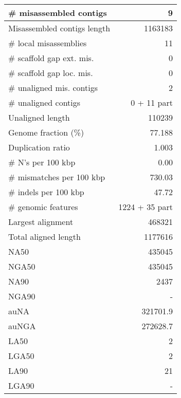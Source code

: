 \documentclass[12pt,a4paper]{article}
\begin{document}
\begin{table}[ht]
\begin{center}
\begin{tabular}{|l*{1}{|r}|}
\# misassembled contigs & 9 \\ \hline
Misassembled contigs length & 1163183 \\ \hline
\# local misassemblies & 11 \\ \hline
\# scaffold gap ext. mis. & 0 \\ \hline
\# scaffold gap loc. mis. & 0 \\ \hline
\# unaligned mis. contigs & 2 \\ \hline
\# unaligned contigs & 0 + 11 part \\ \hline
Unaligned length & 110239 \\ \hline
Genome fraction (\%) & 77.188 \\ \hline
Duplication ratio & 1.003 \\ \hline
\# N's per 100 kbp & 0.00 \\ \hline
\# mismatches per 100 kbp & 730.03 \\ \hline
\# indels per 100 kbp & 47.72 \\ \hline
\# genomic features & 1224 + 35 part \\ \hline
Largest alignment & 468321 \\ \hline
Total aligned length & 1177616 \\ \hline
NA50 & 435045 \\ \hline
NGA50 & 435045 \\ \hline
NA90 & 2437 \\ \hline
NGA90 & - \\ \hline
auNA & 321701.9 \\ \hline
auNGA & 272628.7 \\ \hline
LA50 & 2 \\ \hline
LGA50 & 2 \\ \hline
LA90 & 21 \\ \hline
LGA90 & - \\ \hline
\end{tabular}
\end{center}
\end{table}
\end{document}
